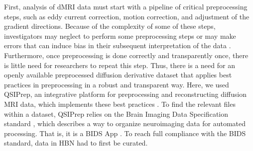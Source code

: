 \documentclass[fleqn,10pt]{wlscirep}
\begin{document}
First, analysis of dMRI data must start with a pipeline of critical
preprocessing steps, such as eddy current correction, motion correction, and
adjustment of the gradient directions. Because of the complexity of some of
these steps, investigators may neglect to perform some preprocessing steps or
may make errors that can induce bias in their subsequent interpretation of the
data \cite{jones2010-ps}. Furthermore, once preprocessing is done correctly and
transparently once, there is little need for researchers to repeat this step.
Thus, there is a need for an openly available preprocessed diffusion derivative
dataset that applies best practices in preprocessing in a robust and transparent
way. Here, we used QSIPrep, an integrative platform for preprocessing and
reconstructing diffusion MRI data, which implements these best practices
\cite{cieslak2021-iq}. To find the relevant files within a dataset, QSIPrep
relies on the Brain Imaging Data Specification standard \cite{gorgolewski2016},
which describes a way to organize neuroimaging data for automated processing.
That is, it is a BIDS App \cite{Gorgolewski2017-mb}. To reach full compliance
with the BIDS standard, data in HBN had to first be curated.
\end{document}
